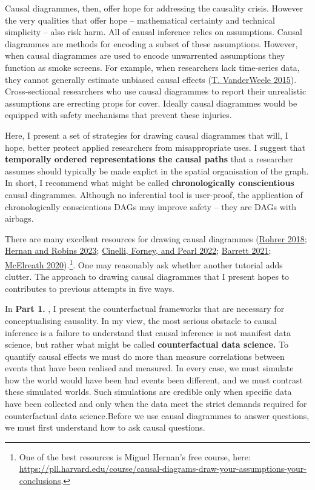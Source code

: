 \documentclass[
  singlecolumn]{report}
\begin{document}
Causal diagrammes, then, offer hope for addressing the causality crisis.
However the very qualities that offer hope -- mathematical certainty and
technical simplicity -- also risk harm. All of causal inference relies
on assumptions. Causal diagrammes are methods for encoding a subset of
these assumptions. However, when causal diagrammes are used to encode
unwarrented assumptions they function as smoke screens. For example,
when researchers lack time-series data, they cannot generally estimate
unbiased causal effects (\protect\hyperlink{ref-vanderweele2015}{T.
VanderWeele 2015}). Cross-sectional researchers who use causal
diagrammes to report their unrealistic assumptions are errecting props
for cover. Ideally causal diagrammes would be equipped with safety
mechanisms that prevent these injuries.

Here, I present a set of strategies for drawing causal diagrammes that
will, I hope, better protect applied researchers from misappropriate
uses. I suggest that \textbf{temporally ordered representations the
causal paths} that a researcher assumes should typically be made explict
in the spatial organisation of the graph. In short, I recommend what
might be called \textbf{chronologically conscientious} causal
diagrammes. Although no inferential tool is user-proof, the application
of chronologically conscientious DAGs may improve safety -- they are
DAGs with airbags.

There are many excellent resources for drawing causal diagrammes
(\protect\hyperlink{ref-rohrer2018}{Rohrer 2018};
\protect\hyperlink{ref-hernan2023}{Hernan and Robins 2023};
\protect\hyperlink{ref-cinelli2022}{Cinelli, Forney, and Pearl 2022};
\protect\hyperlink{ref-barrett2021}{Barrett 2021};
\protect\hyperlink{ref-mcelreath2020}{McElreath 2020}).\footnote{One of
  the best resources is Miguel Hernan's free course, here:
  \url{https://pll.harvard.edu/course/causal-diagrams-draw-your-assumptions-your-conclusions}.}.
One may reasonably ask whether another tutorial adds clutter. The
approach to drawing causal diagrammes that I present hopes to
contributes to previous attempts in five ways.

In \textbf{Part 1.} , I present the counterfactual frameworks that are
necessary for conceptualising causality. In my view, the most serious
obstacle to causal inference is a failure to understand that causal
inference is not manifest data science, but rather what might be called
\textbf{counterfactual data science.} To quantify causal effects we must
do more than measure correlations between events that have been realised
and measured. In every case, we must simulate how the world would have
been had events been different, and we must contrast these simulated
worlds. Such simulations are credible only when specific data have been
collected and only when the data meet the strict demands required for
counterfactual data science.Before we use causal diagrammes to answer
questions, we must first understand how to ask causal questions.
\end{document}
